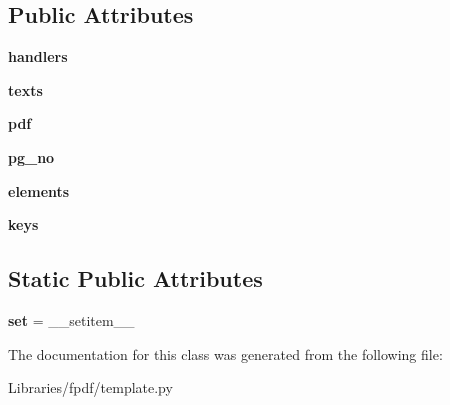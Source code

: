 \subsection*{Public Attributes}
\begin{DoxyCompactItemize}
\item 
{\bfseries handlers}\hypertarget{class_libraries_1_1fpdf_1_1template_1_1_template_a84376976caec5284e9326bae849a570a}{}\label{class_libraries_1_1fpdf_1_1template_1_1_template_a84376976caec5284e9326bae849a570a}

\item 
{\bfseries texts}\hypertarget{class_libraries_1_1fpdf_1_1template_1_1_template_a3440b4c7d7049526813ddf54a6f03bda}{}\label{class_libraries_1_1fpdf_1_1template_1_1_template_a3440b4c7d7049526813ddf54a6f03bda}

\item 
{\bfseries pdf}\hypertarget{class_libraries_1_1fpdf_1_1template_1_1_template_a1ce5002ff49c39f3591c29776f4532ee}{}\label{class_libraries_1_1fpdf_1_1template_1_1_template_a1ce5002ff49c39f3591c29776f4532ee}

\item 
{\bfseries pg\+\_\+no}\hypertarget{class_libraries_1_1fpdf_1_1template_1_1_template_aa627ffd57c6dea61600e7b97e49a8255}{}\label{class_libraries_1_1fpdf_1_1template_1_1_template_aa627ffd57c6dea61600e7b97e49a8255}

\item 
{\bfseries elements}\hypertarget{class_libraries_1_1fpdf_1_1template_1_1_template_ada33408a6c8526f24a52f849b93bf82a}{}\label{class_libraries_1_1fpdf_1_1template_1_1_template_ada33408a6c8526f24a52f849b93bf82a}

\item 
{\bfseries keys}\hypertarget{class_libraries_1_1fpdf_1_1template_1_1_template_a02185cbdc6ee08fd8fe18b748ad44112}{}\label{class_libraries_1_1fpdf_1_1template_1_1_template_a02185cbdc6ee08fd8fe18b748ad44112}

\end{DoxyCompactItemize}
\subsection*{Static Public Attributes}
\begin{DoxyCompactItemize}
\item 
{\bfseries set} = \+\_\+\+\_\+setitem\+\_\+\+\_\+\hypertarget{class_libraries_1_1fpdf_1_1template_1_1_template_a88fe6aa33a35865e26935783e49a79d1}{}\label{class_libraries_1_1fpdf_1_1template_1_1_template_a88fe6aa33a35865e26935783e49a79d1}

\end{DoxyCompactItemize}


The documentation for this class was generated from the following file\+:\begin{DoxyCompactItemize}
\item 
Libraries/fpdf/template.\+py\end{DoxyCompactItemize}

